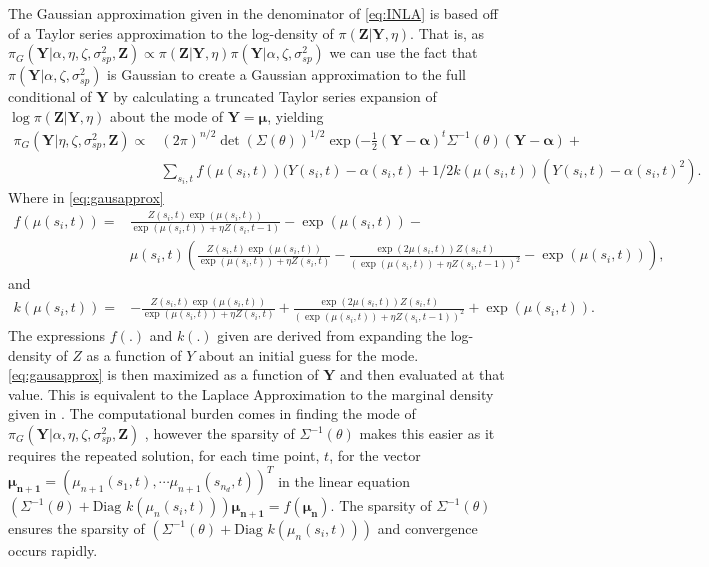\documentclass[11pt]{isuthesis}
\begin{document}
	The Gaussian approximation given in the denominator of \eqref{eq:INLA} is based off of a Taylor series approximation to the log-density of $\pi(\boldsymbol{Z}|\boldsymbol{Y},\eta)$.  That is, as $\pi_G(\boldsymbol{Y}|\alpha,\eta,\zeta,\sigma_{sp}^2,\boldsymbol{Z})\propto\pi(\boldsymbol{Z}|\boldsymbol{Y},\eta)\pi(\boldsymbol{Y}|\alpha,\zeta,\sigma_{sp}^2)$ we can use the fact that $\pi(\boldsymbol{Y}|\alpha,\zeta,\sigma_{sp}^2)$ is Gaussian to create a Gaussian approximation to the full conditional of $\boldsymbol{Y}$ by calculating a truncated Taylor series expansion of $\log\pi(\boldsymbol{Z}|\boldsymbol{Y},\eta)$ about the mode of $\boldsymbol{Y}=\boldsymbol{\mu}$, yielding
	\begin{align}
	\pi_G(\boldsymbol{Y}|\eta,\zeta,\sigma_{sp}^2,\boldsymbol{Z}) \propto& (2 \pi)^{n/2} \det(\Sigma(\theta))^{1/2} \exp(-\frac{1}{2}(\boldsymbol{Y}-\boldsymbol{\alpha})^t \Sigma^{-1}(\theta)(\boldsymbol{Y}-\boldsymbol{\alpha})+\nonumber \\&\sum_{s_i,t} f(\mu(s_i,t))(Y(s_i,t)-\alpha(s_i,t)+
	\label{eq:gausapprox} 1/2 k (\mu(s_i,t))(Y(s_i,t)-\alpha(s_i,t)^2).
	\end{align} 
	Where in \eqref{eq:gausapprox}
	{\small
	\begin{align}
	f(\mu(s_i,t))  =& \frac{Z(s_i,t)\exp(\mu(s_i,t))}{\exp(\mu(s_i,t))+\eta Z(s_i,t-1)}-\exp(\mu(s_i,t)) - \nonumber \\       & \mu(s_i,t)\left(\frac{Z(s_i,t)\exp(\mu(s_i,t))}{\exp(\mu(s_i,t))+\eta Z(s_i,t)}-\frac{\exp(2 \mu(s_i,t))Z(s_i,t)}{\left(\exp(\mu(s_i,t))+\eta Z(s_i,t-1)\right)^2}-\exp(\mu(s_i,t))\right),
	\end{align}
	}%
	and
	\begin{align}
	k(\mu(s_i,t)) =& -\frac{Z(s_i,t)\exp(\mu(s_i,t))}{\exp(\mu(s_i,t))+\eta Z(s_i,t)}+\frac{\exp(2 \mu(s_i,t))Z(s_i,t)}{\left(\exp(\mu(s_i,t))+\eta Z(s_i,t-1)\right)^2}+\exp(\mu(s_i,t)). 
	\end{align}
	The expressions $f(.)$ and $k(.)$ given are derived from expanding the log-density of $Z$ as a function of $Y$ about an initial guess for the mode. \eqref{eq:gausapprox} is then maximized as a function of $\boldsymbol{Y}$ and then evaluated at that value.  This is equivalent to the Laplace Approximation to the marginal density given in \cite{tierney1986accurate}.  The computational burden comes in finding the mode of $\pi_G(\boldsymbol{Y}|\alpha,\eta,\zeta,\sigma_{sp}^2,\boldsymbol{Z})$ , however the sparsity of $\Sigma^{-1}(\theta)$ makes this easier as it requires the repeated solution, for each time point, $t$, for the vector $\boldsymbol{\mu_{n+1}}=(\mu_{n+1}(s_1,t),\cdots\mu_{n+1}(s_{n_d},t))^T$ in the linear equation $\left(\Sigma^{-1}(\theta)+\mbox{Diag }k(\mu_n(s_i,t))\right)\boldsymbol{\mu_{n+1}} = f(\boldsymbol{\mu_n})$.  The sparsity of $\Sigma^{-1}(\theta)$ ensures the sparsity of $\left(\Sigma^{-1}(\theta)+\mbox{Diag }k(\mu_n(s_i,t))\right)$ and convergence occurs rapidly.
	
\end{document}
